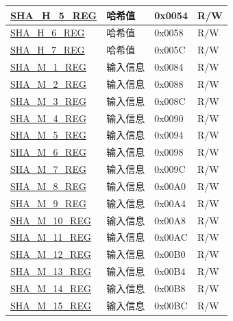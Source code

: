 \begin{longtable}{ | p{6cm} | p{7.2cm} | p{1.3cm} | p{1cm} | }
\hyperref[regdesc:SHAHNREG]{SHA\_H\_5\_REG} & 哈希值 & 0x0054 & R/W \\ \hline
\hyperref[regdesc:SHAHNREG]{SHA\_H\_6\_REG} & 哈希值 & 0x0058 & R/W \\ \hline
\hyperref[regdesc:SHAHNREG]{SHA\_H\_7\_REG} & 哈希值 & 0x005C & R/W \\ \hline
\hyperref[regdesc:SHAMNREG]{SHA\_M\_1\_REG} & 输入信息 & 0x0084 & R/W \\ \hline
\hyperref[regdesc:SHAMNREG]{SHA\_M\_2\_REG} & 输入信息 & 0x0088 & R/W \\ \hline
\hyperref[regdesc:SHAMNREG]{SHA\_M\_3\_REG} & 输入信息 & 0x008C & R/W \\ \hline
\hyperref[regdesc:SHAMNREG]{SHA\_M\_4\_REG} & 输入信息 & 0x0090 & R/W \\ \hline
\hyperref[regdesc:SHAMNREG]{SHA\_M\_5\_REG} & 输入信息 & 0x0094 & R/W \\ \hline
\hyperref[regdesc:SHAMNREG]{SHA\_M\_6\_REG} & 输入信息 & 0x0098 & R/W \\ \hline
\hyperref[regdesc:SHAMNREG]{SHA\_M\_7\_REG} & 输入信息 & 0x009C & R/W \\ \hline
\hyperref[regdesc:SHAMNREG]{SHA\_M\_8\_REG} & 输入信息 & 0x00A0 & R/W \\ \hline
\hyperref[regdesc:SHAMNREG]{SHA\_M\_9\_REG} & 输入信息 & 0x00A4 & R/W \\ \hline
\hyperref[regdesc:SHAMNREG]{SHA\_M\_10\_REG} & 输入信息 & 0x00A8 & R/W \\ \hline
\hyperref[regdesc:SHAMNREG]{SHA\_M\_11\_REG} & 输入信息 & 0x00AC & R/W \\ \hline
\hyperref[regdesc:SHAMNREG]{SHA\_M\_12\_REG} & 输入信息 & 0x00B0 & R/W \\ \hline
\hyperref[regdesc:SHAMNREG]{SHA\_M\_13\_REG} & 输入信息 & 0x00B4 & R/W \\ \hline
\hyperref[regdesc:SHAMNREG]{SHA\_M\_14\_REG} & 输入信息 & 0x00B8 & R/W \\ \hline
\hyperref[regdesc:SHAMNREG]{SHA\_M\_15\_REG} & 输入信息 & 0x00BC & R/W \\ \hline
\end{longtable}

